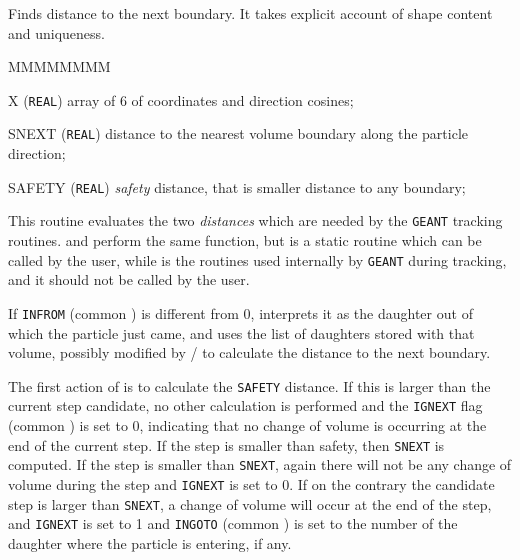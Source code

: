              
             


Finds distance to the next boundary.
It takes explicit account of shape content and uniqueness.
\begin{DLtt}{MMMMMMMM}
\item[X] ({\tt REAL}) array of 6 of coordinates and direction cosines;
\item[SNEXT] ({\tt REAL}) distance to the nearest volume boundary 
along the particle direction;
\item[SAFETY] ({\tt REAL}) {\it safety} distance, that is smaller distance
to any boundary;
\end{DLtt}
 
This routine evaluates the two {\it distances} which are needed by the
{\tt GEANT} tracking routines.  and  perform
the same function, but  is a static routine which can be
called by the user, while  is the routines used internally
by {\tt GEANT} during tracking, and it should not be called by the user.

If {\tt INFROM} (common ) is different from 0, 
interprets it as the daughter out of which the particle just came, and
uses the list of daughters stored with that volume, possibly modified by
/ to calculate the distance to the next boundary.

The first action of  is to calculate the {\tt SAFETY} distance.
If this is larger than the current step candidate, no other calculation is
performed and the {\tt IGNEXT} flag (common ) is set to 0,
indicating that no change of volume is occurring at the end of the current
step. If the step is smaller than safety, then {\tt SNEXT} is computed.
If the step is smaller than {\tt SNEXT}, again there will not be any
change of volume during the step and {\tt IGNEXT} is set to 0.
If on the contrary the candidate step is larger than {\tt SNEXT}, a
change of volume will occur at the end of the step, and {\tt IGNEXT}
is set to 1 and {\tt INGOTO} (common ) is set to the
number of the daughter where the particle is entering, if any.

